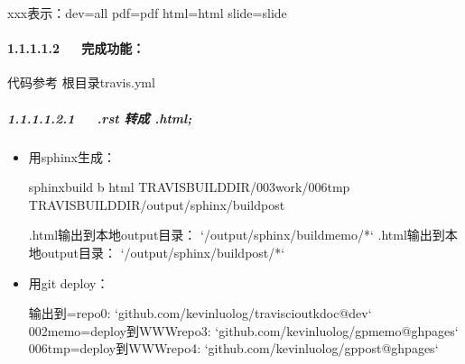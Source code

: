 \documentclass[letterpaper,12pt,english]{sphinxmanual}
\begin{document}
xxx表示：dev=all pdf=pdf html=html slide=slide


\paragraph{1.1.1.1.2   完成功能：}
\label{\detokenize{001software/001install/001._u7f51_u7ad9/gitpage:id2}}
代码参考 根目录travis.yml


\subparagraph{1.1.1.1.2.1   .rst 转成 .html;}
\label{\detokenize{001software/001install/001._u7f51_u7ad9/gitpage:rst-html}}\begin{itemize}
\item {} 
用sphinx生成：

\begin{sphinxVerbatim}[commandchars=\\\{\}]
sphinx\PYGZhy{}build \PYGZhy{}b html \PYGZdl{}TRAVIS\PYGZus{}BUILD\PYGZus{}DIR/003work/006tmp \PYGZdl{}TRAVIS\PYGZus{}BUILD\PYGZus{}DIR/output/sphinx/build\PYGZhy{}post
\end{sphinxVerbatim}

\begin{sphinxVerbatim}[commandchars=\\\{\}]
.html输出到本地output目录： `/output/sphinx/build\PYGZhy{}memo/*`
.html输出到本地output目录： `/output/sphinx/build\PYGZhy{}post/*`
\end{sphinxVerbatim}

\item {} 
用git deploy：

\begin{sphinxVerbatim}[commandchars=\\\{\}]
  
    
 
\end{sphinxVerbatim}

\begin{sphinxVerbatim}[commandchars=\\\{\}]
输出到=\PYGZgt{}repo0: `github.com/kevinluolog/travisci\PYGZus{}out\PYGZus{}kdoc@dev`
002memo=\PYGZgt{}deploy到WWWrepo3: `github.com/kevinluolog/gp\PYGZhy{}memo@gh\PYGZhy{}pages`
006tmp=\PYGZgt{}deploy到WWWrepo4: `github.com/kevinluolog/gp\PYGZhy{}post@gh\PYGZhy{}pages`
\end{sphinxVerbatim}

\end{itemize}
\end{document}
